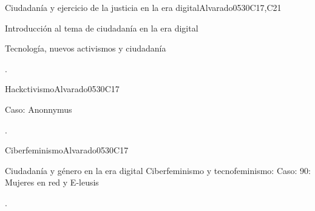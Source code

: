 \begin{syllabus}
\begin{unit}{Ciudadanía y ejercicio de la justicia en la era digital}{}{Alvarado05}{30}{C17,C21}
   \begin{topics}
      \item Introducción al tema de ciudadanía en la era digital
      \item Tecnología,  nuevos activismos y ciudadanía
   \end{topics}

   \begin{learningoutcomes}
      \item .
   \end{learningoutcomes}
\end{unit}
\begin{unit}{Hackctivismo}{}{Alvarado05}{30}{C17}
   \begin{topics}
      \item Caso: Anonnymus
   \end{topics}

   \begin{learningoutcomes}
      \item .
   \end{learningoutcomes}
\end{unit}
\begin{unit}{Ciberfeminismo}{}{Alvarado05}{30}{C17}
   \begin{topics}
      \item Ciudadanía y género en la era digital Ciberfeminismo y tecnofeminismo: Caso: 90: Mujeres en red y E-leusis
   \end{topics}
   \begin{learningoutcomes}
      \item .
   \end{learningoutcomes}
\end{unit}



\begin{coursebibliography}
\end{coursebibliography}

\end{syllabus}
